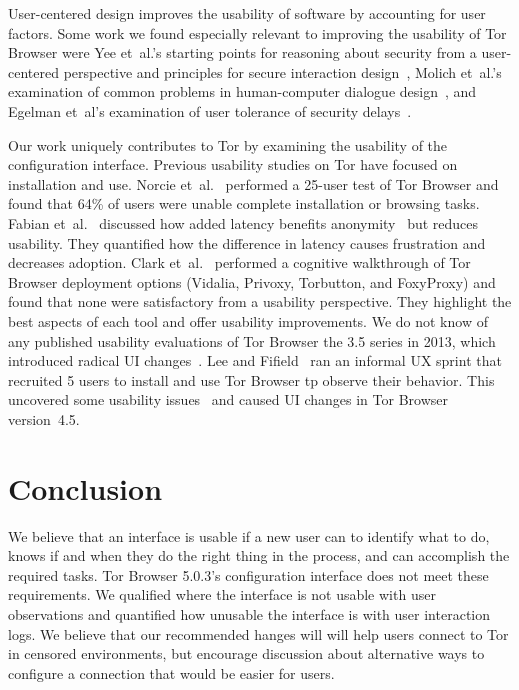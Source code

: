 \documentclass[USenglish,oneside,twocolumn]{article}
\begin{document}
User-centered design improves the usability of software by accounting for user factors. 
Some work we found especially relevant to improving the usability of Tor Browser were
Yee et~al.'s starting points for reasoning about security from
a user-centered perspective and principles for secure interaction design~\cite{yee2002user},  
Molich et~al.'s examination of  common problems in human-computer dialogue design~\cite{molich1990improving}, and Egelman et~al's examination of user tolerance of security delays~\cite{egelmanplease}.

Our work uniquely contributes to Tor by examining the usability of the configuration interface.  
Previous usability studies on Tor have focused on installation and use. Norcie et~al.~\cite{norcie2012eliminating} performed a 25-user test of Tor Browser and found that 64\% of users were unable complete installation or browsing tasks. Fabian et~al.~\cite{fabian2010privately} discussed how added latency benefits anonymity~\cite{dingledine2009performance} but reduces usability. They quantified how the difference in latency causes frustration and decreases adoption. Clark et~al.~\cite{clark2007usability} performed a cognitive walkthrough of Tor Browser deployment options (Vidalia, Privoxy, Torbutton, and FoxyProxy) and found that none were satisfactory from a usability perspective. They highlight the best aspects of each tool and offer usability improvements. We do not know of any published usability evaluations of
Tor Browser the 3.5 series in 2013, which introduced radical UI changes~\cite{torbrowser-35}.
Lee and Fifield~\cite{uxsprint} ran an informal UX sprint that recruited 5 users to install and use Tor Browser tp observe their behavior. This uncovered some usability issues~\cite{uxsprint2015-tickets} and caused UI changes in Tor Browser version~4.5.

\section{Conclusion} 
\label{sec:conclusion}
We believe that an interface is usable if a new user can to identify what to do, knows if and when they do the right thing in the process, and can accomplish the required tasks. Tor Browser 5.0.3's configuration interface does not meet these requirements. We qualified where the interface is not usable with user observations and quantified how unusable the interface is with user interaction logs. We believe that our recommended hanges will will help users connect to Tor in censored environments, but encourage discussion about alternative ways to configure a connection that would be easier for users. 
\end{document}
